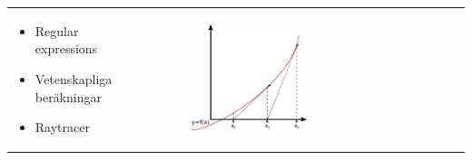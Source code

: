 \documentclass{beamer}
\begin{document}
\begin{frame}

\begin{tabular}{ m{5.5cm} m{4cm} }

\begin{itemize}
	\item Regular expressions
	\item Vetenskapliga beräkningar %
	\item Raytracer
\end{itemize}
&
\begin{figure}[H]
\centering
    \includegraphics[width=0.5\textwidth]{img/metod.png} 

\end{figure}

\end{tabular}


\end{frame}

\end{document}
